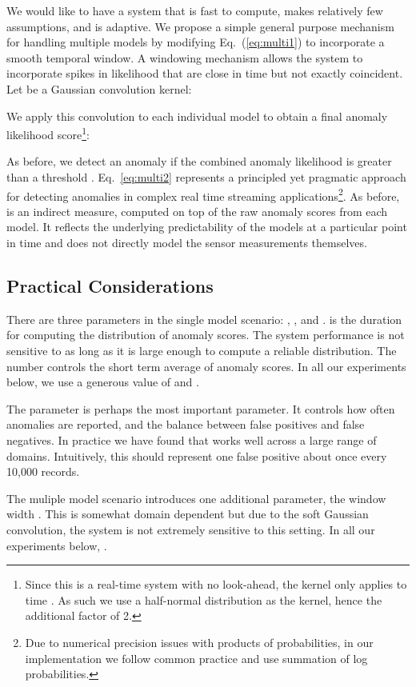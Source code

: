 \documentclass{article}
\begin{document}
We would like to have a system that is fast to compute, makes relatively few
assumptions, and is adaptive. We propose a simple general purpose mechanism for
handling multiple models by modifying Eq.~(\ref{eq:multi1}) to incorporate a
smooth temporal window. A windowing mechanism allows the system to incorporate
spikes in likelihood that are close in time but not exactly coincident.  Let 
be a Gaussian convolution kernel:



We apply this convolution to each individual model to obtain a final anomaly
likelihood score\footnote{Since this is a real-time system with no look-ahead,
the kernel only applies to time . As such we use a half-normal distribution
as the kernel, hence the additional factor of 2.}:



As before, we detect an anomaly if the combined anomaly likelihood is greater
than a threshold . Eq.~\ref{eq:multi2} represents a
principled yet pragmatic approach for detecting anomalies in complex real time
streaming applications\footnote{Due to numerical precision issues with products
of probabilities, in our implementation we follow common practice and use
summation of log probabilities.}. As before,  is an indirect measure,
computed on top of the raw anomaly scores from each model. It reflects the
underlying predictability of the models at a particular point in time and does
not directly model the sensor measurements themselves.

\subsection{Practical Considerations}

There are three parameters in the single model scenario: , , and
.  is the duration for computing the distribution of anomaly
scores. The system performance is not sensitive to  as long as it is large
enough to compute a reliable distribution. The number  controls the short
term average of anomaly scores. In all our experiments below, we use a generous
value of  and .

The parameter  is perhaps the most important parameter. It controls
how often anomalies are reported, and the balance between false positives and
false negatives. In practice we have found that  works well
across a large range of domains. Intuitively, this should represent one false
positive about once every 10,000 records.

The muliple model scenario introduces one additional parameter, the window width
.  This is somewhat domain dependent but due to the soft Gaussian
convolution, the system is not extremely sensitive to this setting. In all our
experiments below, .
\end{document}
